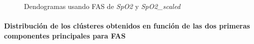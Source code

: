 \begin{figure}[ht]
    \centering
    \hfill
    \caption{Dendogramas usando FAS de \textit{SpO2} y \textit{SpO2\_scaled}}\label{fig:acf_den_spo2}
\end{figure}

\paragraph{Distribución de los clústeres obtenidos en función de las dos primeras componentes principales para FAS}

